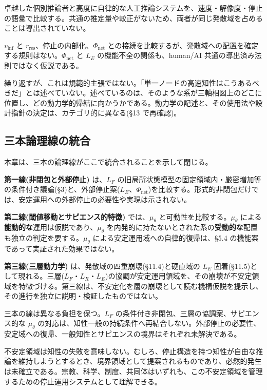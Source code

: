 卓越した個別推論者と高度に自律的な人工推論システムを、速度・解像度・停止の語彙で比較する。共通の推定量や較正がないため、両者が同じ発散域を占めることは導出されていない。

$v_{\text{inf}}$ と $r_{\text{res}}$、停止の内部化、$\Phi_{\text{net}}$ との接続を比較するが、発散域への配置を確定する規則はない。$\Phi_{\text{net}}$ と $L_E$ の機能不全の関係も、human/AI 共通の導出済み法則ではなく仮説である。

繰り返すが、これは規範的主張ではない。「単一ノードの高速知性はこうあるべきだ」とは述べていない。述べているのは、そのような系が三軸相図上のどこに位置し、どの動力学的帰結に向かうかである。動力学の記述と、その使用法や設計指針の決定は、カテゴリ的に異なる(\S{}13 で再確認)。

\bigskip


\subsection{三本論理線の統合}


本章は、三本の論理線がここで統合されることを示して閉じる。

\textbf{第一線(非閉包と外部停止)} は、$L_F$ の旧局所状態模型の固定領域内・厳密増加等の条件付き議論(\S{}3)と、外部停止案($L_E$、$\Phi_{\text{net}}$)を比較する。形式的非閉包だけでは、安定運用への外部停止の必要性や実現は示されない。

\textbf{第二線(閾値移動とサピエンス的特徴)} では、$\mu_\theta$ と可動性を比較する。$\mu_\theta$ による\textbf{能動的な}運用は仮説であり、$\mu_\theta$ を内発的に持たないとされた系の\textbf{受動的な}配置も独立の判定を要する。$\mu_\theta$ による安定運用域への自律的復帰は、\S{}5.4 の機能案であって実証された効果ではない。

\textbf{第三線(三層動力学)} は、発散域の四重崩壊(\S{}11.4)と硬直域の $L_E$ 固着(\S{}11.5)として現れる。三層($L_F$・$L_R$・$L_E$)の協調が安定運用領域を、その崩壊が不安定領域を特徴づける。第三線は、不安定化を層の崩壊として読む機構仮説を提示し、その進行を独立に説明・検証したものではない。

三本の線は異なる負担を保つ。$L_F$ の条件付き非閉包、三層の協調案、サピエンス的な $\mu_\theta$ の対応は、知性一般の持続条件へ再結合しない。外部停止の必要性、安定域への復帰、一般知性とサピエンスの境界はそれぞれ未解決である。

不安定領域は知性の失敗を意味しない。むしろ、停止構造を持つ知性が自由な推論を維持しようとするとき、境界領域として提案されるものであり、必然的発生は未確立である。宗教、科学、制度、共同体はいずれも、この不安定領域を管理するための停止運用システムとして理解できる。

